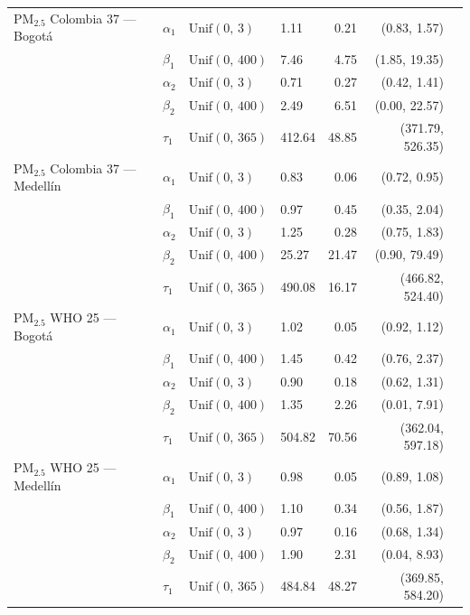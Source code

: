 \begin{longtable}{llllrrr}
PM$_{2.5}$ Colombia 37 --- Bogot\'{a} & $\alpha_{1}$ & $\text{Unif}(0,\,3)$ & 1.11 & 0.21 & (0.83, 1.57) \\
 & $\beta_{1}$ & $\text{Unif}(0,\,400)$ & 7.46 & 4.75 & (1.85, 19.35) \\
 & $\alpha_{2}$ & $\text{Unif}(0,\,3)$ & 0.71 & 0.27 & (0.42, 1.41) \\
 & $\beta_{2}$ & $\text{Unif}(0,\,400)$ & 2.49 & 6.51 & (0.00, 22.57) \\
 & $\tau_{1}$ & $\text{Unif}(0,\,365)$ & 412.64 & 48.85 & (371.79, 526.35) \\
\midrule
PM$_{2.5}$ Colombia 37 --- Medell\'{i}n & $\alpha_{1}$ & $\text{Unif}(0,\,3)$ & 0.83 & 0.06 & (0.72, 0.95) \\
 & $\beta_{1}$ & $\text{Unif}(0,\,400)$ & 0.97 & 0.45 & (0.35, 2.04) \\
 & $\alpha_{2}$ & $\text{Unif}(0,\,3)$ & 1.25 & 0.28 & (0.75, 1.83) \\
 & $\beta_{2}$ & $\text{Unif}(0,\,400)$ & 25.27 & 21.47 & (0.90, 79.49) \\
 & $\tau_{1}$ & $\text{Unif}(0,\,365)$ & 490.08 & 16.17 & (466.82, 524.40) \\
\midrule
PM$_{2.5}$ WHO 25 --- Bogot\'{a} & $\alpha_{1}$ & $\text{Unif}(0,\,3)$ & 1.02 & 0.05 & (0.92, 1.12) \\
 & $\beta_{1}$ & $\text{Unif}(0,\,400)$ & 1.45 & 0.42 & (0.76, 2.37) \\
 & $\alpha_{2}$ & $\text{Unif}(0,\,3)$ & 0.90 & 0.18 & (0.62, 1.31) \\
 & $\beta_{2}$ & $\text{Unif}(0,\,400)$ & 1.35 & 2.26 & (0.01, 7.91) \\
 & $\tau_{1}$ & $\text{Unif}(0,\,365)$ & 504.82 & 70.56 & (362.04, 597.18) \\
\midrule
PM$_{2.5}$ WHO 25 --- Medell\'{i}n & $\alpha_{1}$ & $\text{Unif}(0,\,3)$ & 0.98 & 0.05 & (0.89, 1.08) \\
 & $\beta_{1}$ & $\text{Unif}(0,\,400)$ & 1.10 & 0.34 & (0.56, 1.87) \\
 & $\alpha_{2}$ & $\text{Unif}(0,\,3)$ & 0.97 & 0.16 & (0.68, 1.34) \\
 & $\beta_{2}$ & $\text{Unif}(0,\,400)$ & 1.90 & 2.31 & (0.04, 8.93) \\
 & $\tau_{1}$ & $\text{Unif}(0,\,365)$ & 484.84 & 48.27 & (369.85, 584.20) \\
\end{longtable}
